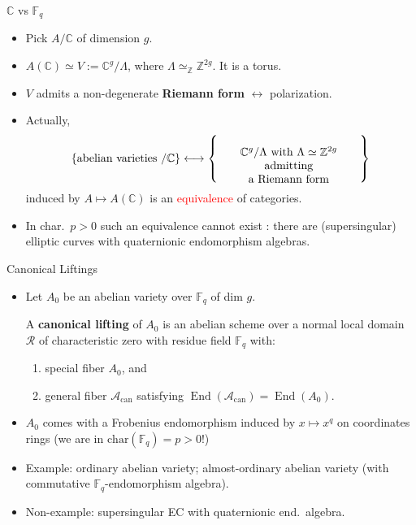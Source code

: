 \documentclass[usenames,dvipsnames,handout]{beamer}
\def\Z{\mathbb{Z}}
\def\C{\mathbb{C}}
\def\F{\mathbb{F}}
\DeclareMathOperator{\End}{End}
\newcommand{\set}[1]{\left\lbrace#1\right\rbrace }
\newcommand{\Acan}{\mathcal{A}_{\mathrm{can}}}
\newcommand{\red}[1]{\textcolor{red}{#1}}
\begin{document}
\begin{frame}{ $\C$ vs $\F_q$ }    
    \begin{itemize}
     \item Pick $A/\C$ of dimension $g$. 
	 \pause \item $A(\C)\simeq V:=\C^g/\Lambda$, where $\Lambda\simeq_\Z\Z^{2g}$. It is a {torus}.
	 \pause \item $V$ admits a non-degenerate {\bf Riemann form} $\longleftrightarrow$ polarization.
	 \pause \item Actually,
	  \[
      \set{ \text{abelian varieties $/\C$} } \longleftrightarrow 
      \set{\parbox[c]{12.5em}{\center $\C^g/\Lambda$ with $\Lambda\simeq \Z^{2g}$ admitting\\ a Riemann form}}
     \]
	  induced by $ A \mapsto A(\C)$ is an \red{equivalence} of categories.
	 \pause \item In {char.~$p>0$} such an equivalence {cannot exist} : there are (supersingular) elliptic curves with quaternionic endomorphism algebras.
	\end{itemize}
\end{frame}

\begin{frame}{ Canonical Liftings } 
    \begin{itemize}
    \item Let $A_0$ be an abelian variety over $\F_q$ of dim $g$.
\pause
    \begin{definition}
	    A {\bf canonical lifting} of $A_0$ is an abelian scheme over a normal local domain $\mathcal{R}$ of characteristic zero with residue field $\F_q$ with:
	    \begin{enumerate}
	    \item special fiber $A_0$, and
	    \item general fiber $\Acan$ satisfying $\End(\Acan)= \End(A_0)$.
	    \end{enumerate}
    \end{definition}
\pause
    \item $A_0$ comes with a Frobenius endomorphism induced by $x\mapsto x^q$ on coordinates rings (we are in $\mathrm{char}(\F_q) =p>0$!)
\pause    
    \item Example: ordinary abelian variety; almost-ordinary abelian variety (with commutative $\F_q$-endomorphism algebra). 
\pause
    \item Non-example: supersingular EC with quaternionic end.~algebra.
	\end{itemize}
\end{frame}
\end{document}

